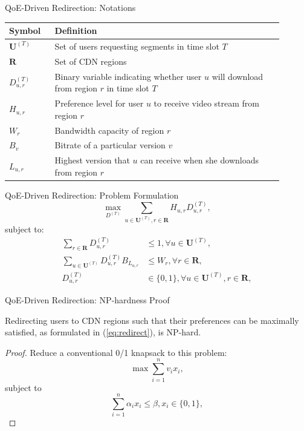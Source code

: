 \documentclass{beamer}
\newcommand{\CDNRegions}{\mathbf{R}}
\newcommand{\Users}{\mathbf{U}}
\newcommand{\Redirect}{D}
\newcommand{\bandwidth}{W}
\newcommand{\Version}{L}
\newcommand{\USPref}{H}
\newcommand{\Bitrate}{B}
\begin{document}
\begin{frame}{QoE-Driven Redirection: Notations}
	\centering
	\begin{tabular}{|p{0.15\linewidth}||p{0.75\linewidth}|}
		\hline 
		Symbol & Definition \\ 
		\hline
		\emph{$\Users^{(T)}$} 		& Set of users requesting segments in time slot $T$ \\
		\emph{$\CDNRegions$} 		& Set of CDN regions  \\
		\emph{$\Redirect^{(T)}_{u,r}$} 		& Binary variable indicating whether user $u$ will download from region $r$ in time slot $T$\\
		\emph{$\USPref_{u,r}$} 		& Preference level for user $u$ to receive video stream from region $r$ \\ 
		\emph{$\bandwidth_r$} 		& Bandwidth capacity of  region $r$ \\ 	
		\emph{$\Bitrate_v$} 		&  Bitrate of a particular version $v$ \\
		\emph{$\Version_{u,r}$} 		&  Highest version that $u$ can receive when she downloads from region $r$ \\
		\hline 
	\end{tabular} 
\end{frame}

\begin{frame}{QoE-Driven Redirection: Problem Formulation}
	\begin{equation}
	\max_{\Redirect^{(T)}} \sum_{u \in \Users^{(T)}, r \in \CDNRegions} \USPref_{u,r} \Redirect^{(T)}_{u,r},
	\label{eq:redirect}
	\end{equation}
	subject to:
	\[
	\begin{split}
	\sum_{r \in \CDNRegions} \Redirect^{(T)}_{u,r} & \le 1, \forall u \in \Users^{(T)},\\	
	\sum_{u \in \Users^{(T)}} \Redirect^{(T)}_{u,r} \Bitrate_{\Version_{u,r}} & \le \bandwidth_{r}, \forall r \in \CDNRegions,\\
	\Redirect^{(T)}_{u,r} & \in \{0,1\}, \forall u \in \Users^{(T)}, r \in \CDNRegions,
	\end{split}
	\]
\end{frame}

\begin{frame}{QoE-Driven Redirection: NP-hardness Proof}
	\begin{theorem}
		Redirecting users to CDN regions such that their preferences can be maximally satisfied, as formulated in (\ref{eq:redirect}), is NP-hard.
	\end{theorem}
	
	\begin{proof}
		Reduce a conventional 0/1 knapsack to this problem:
		$$
		\max \sum_{i=1}^{n}v_i x_i,
		$$
		subject to
		$$
		\sum_{i=1}^{n} \alpha_i x_i \le \beta, 
		x_i \in \{0,1\},
		$$
	\end{proof}
\end{frame}	
\end{document}
